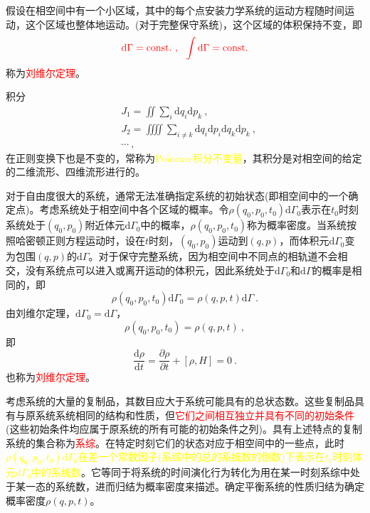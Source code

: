 \documentclass[11pt,a4paper]{article}
\newcommand{\dif}{\mathrm{d}}
\begin{document}
假设在相空间中有一个小区域，其中的每个点安装力学系统的运动方程随时间运动，这个区域也整体地运动。(对于完整保守系统)，这个区域的体积保持不变，即
\begin{equation}
\color{red} \dif \Gamma = \text{const.}  ~, ~~\int \dif \Gamma = \text{const.} 
\end{equation}
称为\textcolor{red}{刘维尔定理}。

积分
\begin{align*}
& J_1 = \iint \sum_i \dif q_i \dif p_k ~, \\
& J_2 = \iiiint \sum_{i \neq k} \dif q_i \dif p_i \dif q_k \dif p_k ~, \\
& \cdots ~,
\end{align*}
在正则变换下也是不变的，常称为\textcolor{yellow}{Poincare积分不变量}，其积分是对相空间的给定的二维流形、四维流形进行的。

对于自由度很大的系统，通常无法准确指定系统的初始状态(即相空间中的一个确定点)。考虑系统处于相空间中各个区域的概率。令$\rho(q_0, p_0, t_0) \dif \Gamma_0$表示在$t_0$时刻系统处于$(q_0, p_0)$附近体元$\dif \Gamma_0$中的概率，$\rho(q_0, p_0, t_0)$称为概率密度。当系统按照哈密顿正则方程运动时，设在$t$时刻，$(q_0, p_0)$运动到$(q, p)$，而体积元$\dif \Gamma_0$变为包围$(q, p)$的$\dif \Gamma$。对于保守完整系统，因为相空间中不同点的相轨道不会相交，没有系统点可以进入或离开运动的体积元，因此系统处于$\dif \Gamma_0$和$\dif \Gamma$的概率是相同的，即
\begin{equation*}
\rho(q_0, p_0, t_0) \dif \Gamma_0 = \rho(q, p, t) \dif \Gamma ~.
\end{equation*}
由刘维尔定理，$\dif \Gamma_0 = \dif \Gamma$，
\begin{equation}
\rho(q_0, p_0, t_0) = \rho(q, p, t) ~,
\end{equation}
即
\begin{equation}
\dfrac{\dif \rho}{\dif t} = \dfrac{\partial \rho}{ \partial t} + [\rho, H] = 0 ~.
\end{equation}
也称为\textcolor{red}{刘维尔定理}。

考虑系统的大量的复制品，其数目应大于系统可能具有的总状态数。这些复制品具有与原系统系统相同的结构和性质，但\textcolor{red}{它们之间相互独立并具有不同的初始条件}(这些初始条件均应属于原系统的所有可能的初始条件之列)。具有上述特点的复制系统的集合称为\textcolor{red}{系综}。在特定时刻它们的状态对应于相空间中的一些点，此时\textcolor{yellow}{$\rho(q_0, p_0, t_0) \dif \Gamma_0$在差一个常数因子(系综中的总的系统数的倒数)下表示在$t_0$时刻体元$\dif \Gamma_0$中的系统数}。它等同于将系统的时间演化行为转化为用在某一时刻系综中处于某一态的系统数，进而归结为概率密度来描述。确定平衡系统的性质归结为确定概率密度$\rho(q, p, t)$。
\end{document}
